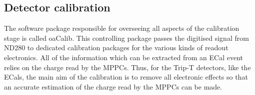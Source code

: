 \subsection{Detector calibration}
\label{subsec:DetectorCalibration}
The software package responsible for overseeing all aspects of the calibration stage is called oaCalib.  This controlling package passes the digitised signal from ND280 to dedicated calibration packages for the various kinds of readout electronics.  All of the information which can be extracted from an ECal event relies on the charge read by the MPPCs.  Thus, for the Trip-T detectors, like the ECals, the main aim of the calibration is to remove all electronic effects so that an accurate estimation of the charge read by the MPPCs can be made.  
\newline
\newline
